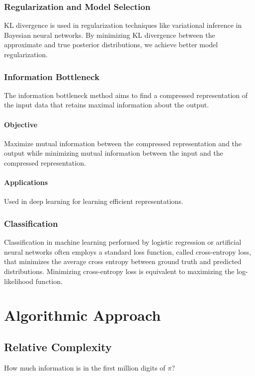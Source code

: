 \documentclass[12pt,sans]{article}
\theoremstyle{definition}
\theoremstyle{plain}
\theoremstyle{remark}
\begin{document}
\subsubsection{Regularization and Model Selection}

KL divergence is used in regularization techniques like variational inference in Bayesian neural networks. By minimizing KL divergence between the approximate and true posterior distributions, we achieve better model regularization.

\subsubsection{Information Bottleneck}

The information bottleneck method aims to find a compressed representation of the input data that retains maximal information about the output.

\paragraph{Objective} Maximize mutual information between the compressed representation and the output while minimizing mutual information between the input and the compressed representation.

\paragraph{Applications} Used in deep learning for learning efficient representations.

\subsubsection{Classification}
Classification in machine learning performed by logistic regression or artificial neural networks often employs a standard loss function, called cross-entropy loss, that minimizes the average cross entropy between ground truth and predicted distributions.
Minimizing cross-entropy loss is equivalent to maximizing the log-likelihood function.


\section{Algorithmic Approach}
\subsection{Relative Complexity}
How much information is in the first million digits of $\pi$?
\end{document}
